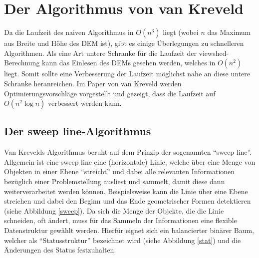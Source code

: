 \section{Der Algorithmus von van Kreveld}

Da die Laufzeit des naiven Algorithmus in $O(n^3)$ liegt (wobei $n$ das Maximum aus Breite und Höhe des DEM ist), gibt es einige Überlegungen zu 
schnelleren Algorithmen. Als eine Art untere Schranke für die Laufzeit der viewshed-Berechnung kann das Einlesen des DEMs gesehen werden, welches 
in $O(n^2)$ liegt. Somit sollte eine Verbesserung der Laufzeit möglichst nahe an diese untere Schranke heranreichen. Im Paper von van Kreveld 
\cite{vanKrev} werden Optimierungsvorschläge vorgestellt und gezeigt, dass die Laufzeit auf $O(n^2\log n)$ verbessert werden kann. 

\subsection{Der sweep line-Algorithmus}
Van Krevelds Algorithmus beruht auf dem Prinzip der sogenannten ``sweep line''. Allgemein ist eine sweep line eine (horizontale) Linie, 
welche über eine Menge von Objekten in einer Ebene ``streicht'' und dabei alle relevanten Informationen bezüglich einer Problemstellung ausliest und 
sammelt, damit diese dann weiterverarbeitet werden können. Beispielsweise kann die Linie über eine Ebene streichen und dabei den Beginn und das Ende 
geometrischer Formen detektieren (siehe Abbildung \ref{sweep}). Da sich die Menge der Objekte, die die Linie schneiden, oft ändert, muss für das 
Sammeln der Informationen eine flexible Datenstruktur gewählt werden. Hierfür eignet sich ein balancierter binärer Baum, welcher als 
``Statusstruktur'' bezeichnet wird (siehe Abbildung \ref{stat}) und die Änderungen des Status festzuhalten. 

